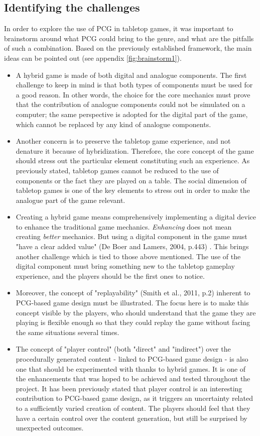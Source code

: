 \subsection{Identifying the challenges}
In order to explore the use of PCG in tabletop games, it was important to brainstorm around what PCG could bring to the genre, and what are the pitfalls of such a combination. Based on the previously established framework, the main ideas can be pointed out (see appendix \ref{fig:brainstorm1}).
\begin{itemize}
\item A hybrid game is made of both digital and analogue components. The first challenge to keep in mind is that both types of components must be used for a good reason. In other words, the choice for the core mechanics must prove that the contribution of analogue components could not be simulated on a computer; the same perspective is adopted for the digital part of the game, which cannot be replaced by any kind of analogue components.  
\item Another concern is to preserve the tabletop game experience, and not denature it because of hybridization. Therefore, the core concept of the game should stress out the particular element constituting such an experience. As previously stated, tabletop games cannot be reduced to the use of components or the fact they are played on a table. The social dimension of tabletop games is one of the key elements to stress out in order to make the analogue part of the game relevant.
\item Creating a hybrid game means comprehensively implementing a digital device to enhance the traditional game mechanics. \textit{Enhancing} does not mean creating \textit{better} mechanics. But using a digital component in the game must "have a clear added value" (De Boer and Lamers, 2004, p.443) \cite{chap:aug}. This brings another challenge which is tied to those above mentioned. The use of the digital component must bring something new to the tabletop gameplay experience, and the players should be the first ones to notice.
\item Moreover, the concept of "replayability" (Smith et al., 2011, p.2) \cite{pdf:pcgbased} inherent to PCG-based game design must be illustrated. The focus here is to make this concept visible by the players, who should understand that the game they are playing is flexible enough so that they could replay the game without facing the same situations several times.
\item The concept of "player control" (both "direct" and "indirect") \cite{pdf:pcgbased} over the procedurally generated content - linked to PCG-based game design - is also one that should be experimented with thanks to hybrid games. It is one of the enhancements that was hoped to be achieved and tested throughout the project. It has been previously stated that player control is an interesting contribution to PCG-based game design, as it triggers an uncertainty related to a sufficiently varied creation of content. The players should feel that they have a certain control over the content generation, but still be surprised by unexpected outcomes.

\end{itemize}
